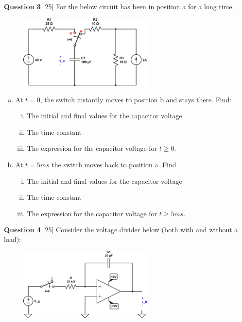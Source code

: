 \documentclass[12pt]{article}
\begin{document}
\newpage
{\bf Question 3} [25] 
\newline
For the below circuit has been in position a for a long time. 

\begin{figure}[h!]
     \centering
       \includegraphics[clip,width=0.6\textwidth]{mid2_3.png}
\end{figure}

\begin{enumerate}[(a)]
\item At $t=0$, the switch instantly moves to position b and stays there. Find:
\begin{enumerate}[(i)]
\item The initial and final values for the capacitor voltage
\item The time constant
\item The expression for the capacitor voltage for $t \geq 0$.
\end{enumerate}
\item At $t = 5ms$ the switch moves back to position a. Find
\begin{enumerate}[(i)]
\item The initial and final values for the capacitor voltage
\item The time constant
\item The expression for the capacitor voltage for $t \geq 5 ms$.
\end{enumerate}

\end{enumerate}

\newpage
{\bf Question 4} [25] 
\newline
Consider the voltage divider below (both with and without a load):

\begin{figure}[!h]
  \centering 
  \includegraphics[clip,width=0.6\textwidth]{mid2_4.png}
\end{figure}
\end{document}
